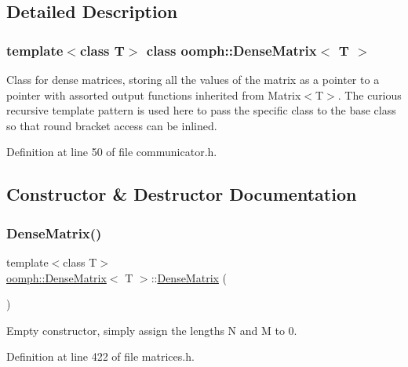 \subsection{Detailed Description}
\subsubsection*{template$<$class T$>$\newline
class oomph\+::\+Dense\+Matrix$<$ T $>$}

Class for dense matrices, storing all the values of the matrix as a pointer to a pointer with assorted output functions inherited from Matrix$<$\+T$>$. The curious recursive template pattern is used here to pass the specific class to the base class so that round bracket access can be inlined. 

Definition at line 50 of file communicator.\+h.



\subsection{Constructor \& Destructor Documentation}
\mbox{\label{classoomph_1_1DenseMatrix_aecfca835918b50b607e080fc706b6fcf}} 
\subsubsection{\texorpdfstring{Dense\+Matrix()}{DenseMatrix()}\hspace{0.1cm}{\footnotesize\ttfamily [1/5]}}
{\footnotesize\ttfamily template$<$class T$>$ \\
\hyperlink{classoomph_1_1DenseMatrix}{oomph\+::\+Dense\+Matrix}$<$ T $>$\+::\hyperlink{classoomph_1_1DenseMatrix}{Dense\+Matrix} (\begin{DoxyParamCaption}{ }\end{DoxyParamCaption})\hspace{0.3cm}{\ttfamily [inline]}}



Empty constructor, simply assign the lengths N and M to 0. 



Definition at line 422 of file matrices.\+h.

\mbox{\label{classoomph_1_1DenseMatrix_a1d8bf7ffb6cc91b882be17b25ff6d452}} 
